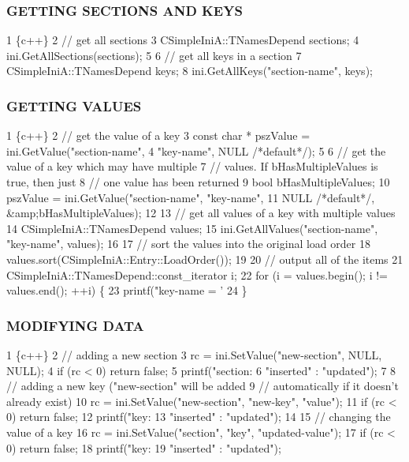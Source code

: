 \subsubsection*{G\+E\+T\+T\+I\+NG S\+E\+C\+T\+I\+O\+NS A\+ND K\+E\+YS}


\begin{DoxyCode}
1 \{c++\}
2 // get all sections
3 CSimpleIniA::TNamesDepend sections;
4 ini.GetAllSections(sections);
5 
6 // get all keys in a section
7 CSimpleIniA::TNamesDepend keys;
8 ini.GetAllKeys("section-name", keys);
\end{DoxyCode}


\subsubsection*{G\+E\+T\+T\+I\+NG V\+A\+L\+U\+ES}


\begin{DoxyCode}
1 \{c++\}
2 // get the value of a key
3 const char * pszValue = ini.GetValue("section-name", 
4     "key-name", NULL /*default*/);
5 
6 // get the value of a key which may have multiple 
7 // values. If bHasMultipleValues is true, then just 
8 // one value has been returned
9 bool bHasMultipleValues;
10 pszValue = ini.GetValue("section-name", "key-name", 
11     NULL /*default*/, &amp;bHasMultipleValues);
12 
13 // get all values of a key with multiple values
14 CSimpleIniA::TNamesDepend values;
15 ini.GetAllValues("section-name", "key-name", values);
16 
17 // sort the values into the original load order
18 values.sort(CSimpleIniA::Entry::LoadOrder());
19 
20 // output all of the items
21 CSimpleIniA::TNamesDepend::const\_iterator i;
22 for (i = values.begin(); i != values.end(); ++i) \{ 
23     printf("key-name = '%
24 \}
\end{DoxyCode}


\subsubsection*{M\+O\+D\+I\+F\+Y\+I\+NG D\+A\+TA}


\begin{DoxyCode}
1 \{c++\}
2 // adding a new section
3 rc = ini.SetValue("new-section", NULL, NULL);
4 if (rc < 0) return false;
5 printf("section: %
6     "inserted" : "updated");
7 
8 // adding a new key ("new-section" will be added 
9 // automatically if it doesn't already exist)
10 rc = ini.SetValue("new-section", "new-key", "value");
11 if (rc < 0) return false;
12 printf("key: %
13     "inserted" : "updated");
14 
15 // changing the value of a key
16 rc = ini.SetValue("section", "key", "updated-value");
17 if (rc < 0) return false;
18 printf("key: %
19     "inserted" : "updated");
\end{DoxyCode}


